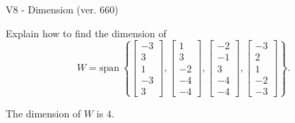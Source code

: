\begin{exercise}
  \begin{exerciseTitle}V8 - Dimension (ver. 660)\end{exerciseTitle}
  \begin{exerciseStatement}
    Explain how to find the dimension of 
\[W=\mathrm{span}\ \left\{\left[\begin{array}{r}
-3 \\
3 \\
1 \\
-3 \\
3
\end{array}\right] , \left[\begin{array}{r}
1 \\
3 \\
-2 \\
-4 \\
-4
\end{array}\right] , \left[\begin{array}{r}
-2 \\
-1 \\
3 \\
-4 \\
-4
\end{array}\right] , \left[\begin{array}{r}
-3 \\
2 \\
1 \\
-2 \\
-3
\end{array}\right]\right\}.\]



  \end{exerciseStatement}
  \begin{exerciseAnswer}
   The dimension of \(W\) is  \(4\).
  


  \end{exerciseAnswer}
\end{exercise}